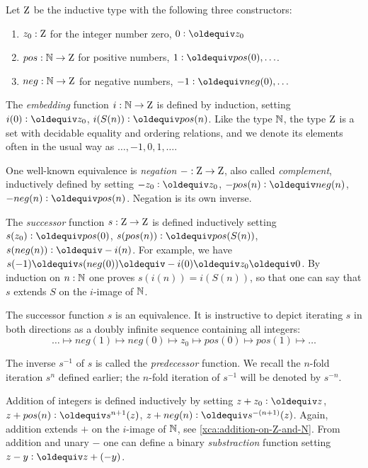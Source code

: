 \begin{definition}\label{def:integers}\label{def:zet}
Let $\mathrm{Z}$ be the inductive type with the following three constructors:
\begin{enumerate}
\item $z_0: \mathrm{Z}$ for the integer number zero, 
$0 \defeq z_0$
\item $pos: \mathbb{N} \to \mathrm{Z}$ for positive numbers,
$1 \defeq pos(0),\ldots$.
\item $neg: \mathbb{N} \to \mathrm{Z}$ for negative numbers, 
$-1 \defeq neg(0),\ldots$
\end{enumerate}

The \emph{embedding} function $i:\mathbb{N}\to\mathrm{Z}$ is defined by induction,
setting $i(0)\defeq z_0$, $i(S(n))\defeq pos(n)$.
Like the type $\mathbb{N}$, the type $\mathrm{Z}$ is a set with decidable equality
and ordering relations,
and we denote its elements often in the usual way as $\ldots,-1,0,1,\ldots$.

One well-known equivalence is \emph{negation} ${-}:\mathrm{Z}\to\mathrm{Z}$, 
also called \emph{complement}, inductively defined by setting 
$-z_0\defeq z_0$, 
$-pos(n)\defeq neg(n)$, 
$-neg(n)\defeq pos(n)$.
Negation is its own inverse.

The \emph{successor} function $s:\mathrm{Z}\to\mathrm{Z}$ is defined inductively setting 
$s(z_0)\defeq pos(0)$, 
$s(pos(n))\defeq pos(S(n))$,
$s(neg(n))\defeq -i(n)$. For example, we have
$s(-1)\jdeq s(neg(0))\jdeq -i(0) \jdeq z_0 \jdeq 0$.
By induction on $n:\mathbb{N}$ one proves $s(i(n))=i(S(n))$, 
so that one can say that $s$ extends $S$
on the $i$-image of $\mathbb{N}$. 

The successor function $s$ is an equivalence.
It is instructive to depict iterating $s$ in both directions as 
a doubly infinite sequence containing all integers:
\[
\ldots \mapsto neg(1) \mapsto neg(0) \mapsto z_0 \mapsto pos(0) \mapsto pos(1) \mapsto \ldots
\]

The inverse $s^{-1}$ of $s$ is called the \emph{predecessor} function.
We recall the $n$-fold iteration $s^n$ defined earlier;
the $n$-fold iteration of $s^{-1}$ will be denoted by $s^{-n}$.

Addition of integers is defined inductively by setting
$z + z_0\defeq z$, 
$z + pos(n)\defeq s^{n+1}(z)$, 
$z + neg(n)\defeq s^{-(n+1)}(z)$.
Again, addition extends $+$ on the $i$-image of $\mathbb{N}$,
see \cref{xca:addition-on-Z-and-N}. 
From addition and unary $-$ one can define a binary
\emph{substraction} function setting $z-y \defeq z+(-y)$.
\end{definition}

